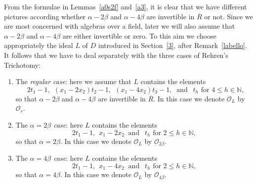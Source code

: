 \documentclass[a4paper]{amsart}
\newcommand{\N}{{\mathbb N}}
\newcommand{\Ro}{{\overline R}}
\newcommand{\al}{\alpha}
\newcommand{\bt}{\beta}
\begin{document}
From the formulae in Lemmas~\ref{a0s2f} and~\ref{a3}, it is clear that we have different pictures according whether $\al-2\bt$ and $\al-4\bt$ are invertible in $\Ro$ or not. 
Since we are most concerned with algebras over a field, later we will also assume that $\al-2\bt$ and $\al-4\bt$ are either invertible or zero. To this aim we choose appropriately the ideal $L$ of $D$ introduced in Section~\ref{3}, after Remark~\ref{labello}.
It follows that we have  to deal separately with the three cases of Rehren's Trichotomy: 
\begin{enumerate}
\item The {\it regular case}: here we assume that $L$ contains the elements 
$$\: \:2t_1-1, \:\:(x_1-2x_2)t_2-1,\:\:(x_1-4x_2)t_3-1,\: \mbox{ and } \:\:t_h \mbox{ for } 4\leq h\in \N,
$$ so that $\al-2\bt$ and $\al-4\bt$ are invertible in $\Ro$. In this case we denote $\mathcal O_L$ by $\mathcal O_r$. 
\item The {\it $\alpha=2\bt$ case}: here  $L$ contains the elements 
$$2t_1-1, \:\:x_1-2x_2 \: \mbox{ and } \:\:t_h \mbox{ for }  2\leq h\in \N,
$$
so that $\al=2\bt$.  In this case we denote  $\mathcal O_L$ by $\mathcal O_{2\bt}$. 
\item The {\it $\alpha=4\bt$ case}: here $L$ contains the elements 
$$2t_1-1, \:\:x_1-4x_2 \: \mbox{ and } \:\:t_h \mbox{ for }  2\leq h\in \N,
$$
so that $\al=4\bt$.  In this case we denote  $\mathcal O_L$ by $\mathcal O_{4\bt}$. 
\end{enumerate}
\end{document}
